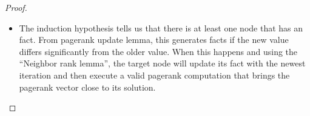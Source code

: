 \begin{proof}
\begin{itemize}
   \item The induction hypothesis tells us that there is at least one node that
      has an  fact. From pagerank update lemma, this generates
       facts if the new value differs significantly from
      the older value. When this happens and using the ``Neighbor rank lemma'',
      the target node will update its  fact with the
      newest iteration and then execute a valid pagerank computation that brings
      the pagerank vector close to its solution.

\end{itemize}

\end{proof}

